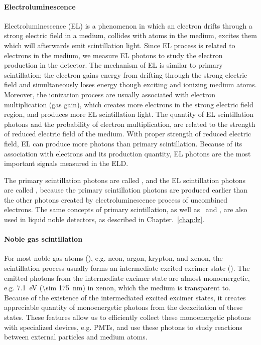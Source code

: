 \paragraph{Electroluminescence} Electroluminescence (EL) is a phenomenon in which an electron drifts through a strong electric field in a medium, collides with atoms in the medium, excites them which will afterwards emit scintillation light. Since EL process is related to electrons in the medium, we measure EL photons to study the electron production in the detector. The mechanism of EL is similar to primary scintillation; the electron gains energy from drifting through the strong electric field and simultaneously loses energy though exciting and ionizing medium atoms. Moreover, the ionization process are usually associated with electron multiplication (gas gain), which creates more electrons in the strong electric field region, and produces more EL scintillation light. The quantity of EL scintillation photons and the probability of electron multiplication, are related to the strength of reduced electric field of the medium. With proper strength of reduced electric field, EL can produce more photons than primary scintillation. Because of its association with electrons and its production quantity, EL photons are the most important signals measured in the ELD.  

The primary scintillation photons are called \sone , and the EL scintillation photons are called \stwo , because the primary scintillation photons are produced earlier than the other photons created by electroluminescence process of uncombined electrons.  The same concepts of primary scintillation, as well as \sone\ and \stwo ,  are also used in liquid noble detectors, as described in Chapter.~\ref{chap:lz}. 

\paragraph{Noble gas scintillation}
For most noble gas atoms (), e.g. neon, argon, krypton, and xenon, the scintillation process usually forms an intermediate excited excimer state (). The emitted photons from the intermediate excimer state are almost monoenergetic, e.g. \SI{7.1}{\electronvolt} (\SI{\sim 175}{\nm}) in xenon, which  the medium is transparent to. Because of the existence of the intermediated excited excimer states, it creates appreciable quantity of monoenergetic photons from the deexcitation of these states. These features allow us to efficiently collect these monoenergetic photons with specialized devices, e.g. PMTs, and use these photons to study reactions between external particles and medium atoms.

